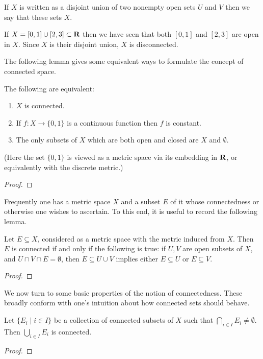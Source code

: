 If $X$ is written as a disjoint union of two nonempty open sets $U$ and $V$ then we say that these sets  $X$.

\begin{example}
If $X=[0,1]\cup[2,3]\subset\mathbf R$ then we have seen that both $[0,1]$ and $[2,3]$ are open in $X$. Since $X$ is their disjoint union, $X$ is disconnected.
\end{example}

The following lemma gives some equivalent ways to formulate the concept of connected space.

\begin{lemma}
The following are equivalent:
\begin{enumerate}[label=(\arabic*)]
\item $X$ is connected.
\item If $f:X\to\{0,1\}$ is a continuous function then $f$ is constant.
\item The only subsets of $X$ which are both open and closed are $X$ and $\emptyset$.
\end{enumerate}
(Here the set $\{0,1\}$ is viewed as a metric space via its embedding in $\mathbf R$, or equivalently with the discrete metric.)
\end{lemma}

\begin{proof}

\end{proof}

Frequently one has a metric space $X$ and a subset $E$ of it whose connectedness or otherwise one wishes to ascertain. To this end, it is useful to record the following lemma.

\begin{lemma}
Let $E\subseteq X$, considered as a metric space with the metric induced from $X$. Then $E$ is connected if and only if the following is true: if $U,V$ are open subsets of $X$, and $U\cap V\cap E=\emptyset$, then $E\subseteq U\cup V$ implies either $E\subseteq U$ or $E\subseteq V$.
\end{lemma}

\begin{proof}

\end{proof}

We now turn to some basic properties of the notion of connectedness. These broadly conform with one's intuition about how connected sets should behave.

\begin{lemma}
Let $\{E_i\mid i\in I\}$ be a collection of connected subsets of $X$ such that $\bigcap_{i\in I}E_i\neq\emptyset$. Then $\bigcup_{i\in I}E_i$ is connected.
\end{lemma}

\begin{proof}

\end{proof}

